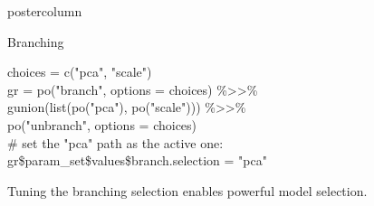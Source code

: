 \documentclass{beamer}
\newlength{\columnheight} %
\newcommand{\codeinline}[1]{\begin{codeboxinline}#1\end{codeboxinline}}
\begin{document}
\begin{frame}[fragile]{}
\begin{columns}
\begin{column}{.245\textwidth}
\begin{beamercolorbox}[center]{postercolumn}
\begin{minipage}{.98\textwidth}
{\begin{myblock}{Branching}
\begin{codeboxexample}[- Preprocessing]
{                choices = c("pca", "scale")\\
                gr = po("branch", options = choices) \%>{}>\%\\
                \hspace*{1ex} gunion(list(po("pca"), po("scale"))) \%>{}>\%\\
                \hspace*{1ex} po("unbranch", options = choices)\\
                \# set the "pca" path as the active one:\\
                gr\$param\_set\$values\$branch.selection = "pca"}
              \end{codeboxexample}
              \vspace{1.0em}
              Tuning the branching selection enables powerful model selection.
            \end{myblock}
            \vspace{-1.0em}
            \vfill}
        \end{minipage}
      \end{beamercolorbox}
    \end{column}
  \end{columns}
\end{frame}
\end{document}
